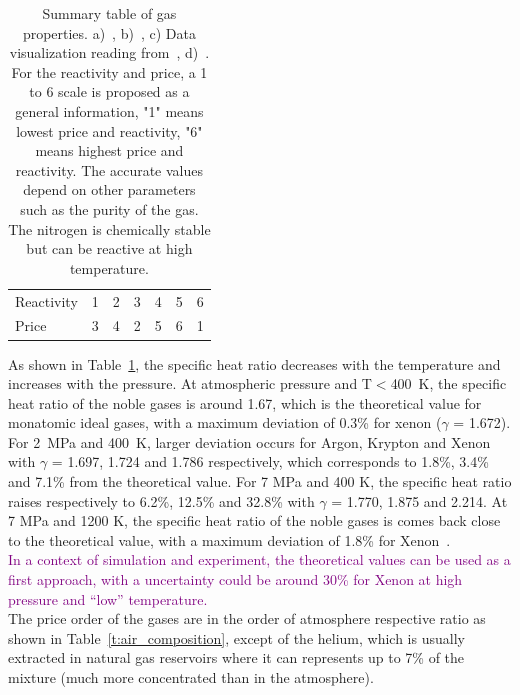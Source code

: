 \documentclass[../main]{subfiles}
\begin{document}
\begin{table}[H]
\begin{tabular}{l c c c c c c}
 \midrule                     
            Reactivity      &  1  & 2  & 3  & 4 & 5 & 6 \\
            Price           & 3     &   4    &  2      & 5    & 6   & 1 \\
\bottomrule
                        \end{tabular}
        \caption[Summary table of gas properties]{Summary table of gas properties. a)~\cite{Tournier2008PropertiesHelium}, b)~\cite{Tournier2008PropertiesNoble}, c) Data visualization reading from~\cite{Tournier2008PropertiesNoble}, d)~\cite{BrinkworthRatiosSpecific}. For the reactivity and price, a 1 to 6 scale is proposed as a general information, "1" means lowest price and reactivity, "6" means highest price and reactivity. The accurate values depend on other parameters such as the purity of the gas. The nitrogen is chemically stable but can be reactive at high temperature.}
        \label{t:gas_properties}
    \end{table}
\FloatBarrier
\vspace{0mm}



As shown in Table~\ref{t:gas_properties}, the specific heat ratio decreases with the temperature and increases with the pressure. At atmospheric pressure and T$<$400~K, the specific heat ratio of the noble gases is around 1.67, which is the theoretical value for monatomic ideal gases, with a maximum deviation of 0.3\% for xenon ($\gamma$ = 1.672). For 2~MPa and 400~K, larger deviation occurs for Argon, Krypton and Xenon with $\gamma$ = 1.697, 1.724 and 1.786 respectively, which corresponds to 1.8\%, 3.4\% and 7.1\% from the theoretical value. For 7 MPa and 400 K, the specific heat ratio raises respectively to 6.2\%, 12.5\% and 32.8\% with $\gamma$ = 1.770, 1.875 and 2.214. At 7 MPa and 1200 K, the specific heat ratio of the noble gases is comes back close to the theoretical value, with a maximum deviation of 1.8\% for Xenon~\cite{Tournier2008PropertiesNoble}.\\

\textcolor{Purple}{In a context of simulation and experiment, the theoretical values can be used as a first approach, with a uncertainty could be around 30\% for Xenon at high pressure and ``low'' temperature.}\\


The price order of the gases are in the order of atmosphere respective ratio as shown in Table~\ref{t:air_composition}, except of the helium, which is usually extracted in natural gas reservoirs where it can represents up to 7\% of the mixture (much more concentrated than in the atmosphere).\\
\end{document}
